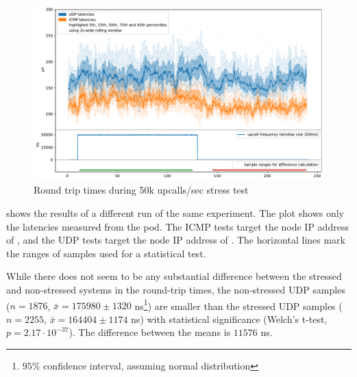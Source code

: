 \begin{figure}
    \centering
    \includegraphics[width=.9\linewidth]{img/packet_flood_50k_latency.pdf}
    \caption{Round trip times during 50k upcalls/sec stress test}
    \label{fig:plot-packet-flood-50k-latency}
\end{figure}

 shows the results of a different run of the same experiment. The plot shows only the latencies measured from the  pod. The ICMP tests target the node IP address of , and the UDP tests target the node IP address of . The horizontal lines mark the ranges of samples used for a statistical test.

While there does not seem to be any substantial difference between the stressed and non-stressed systems in the round-trip times, the non-stressed UDP samples ($n=1876$, $\bar{x}=175980 \pm 1320$ \si{\nano\second}\footnote{$95\%$ confidence interval, assuming normal distribution}) are smaller than the stressed UDP samples ($n=2255$, $\bar{x}=164404 \pm 1174$ \si{\nano\second}) with statistical significance (Welch's t-test, $p=2.17 \cdot 10^{-37}$). The difference between the means is $11576$ \si{\nano\second}.

